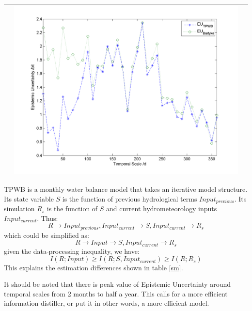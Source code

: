 \documentclass[11pt]{article}
\begin{document}
\begin{table}[H]
{\begin{tabular}{ccc}
&\begin{minipage}{.6\textwidth}\includegraphics[width=\linewidth]{resultgraph/11532500EU.png}\end{minipage}
\\
\bottomrule
\end{tabular}
}
\end{table} 

TPWB is a monthly water balance model that takes an iterative model structure. Its state variable $S$ is the function of previous hydrological terms $Input_{previous}$. Its simulation $R_s$ is the function of $S$ and current hydrometeorology inputs $Input_{current}$. Thus:
\begin{equation}
R \rightarrow Input_{previous},Input_{current} \rightarrow S,Input_{current} \rightarrow R_s
\end{equation}
which could be simplified  as:
 \begin{equation}
R \rightarrow Input \rightarrow S,Input_{current} \rightarrow R_s
\end{equation}
given the data-processing inequality, we have:
\begin{equation}
\label{ie2}
I(R;Input)\geq I(R;S,Input_{current}) \geq I(R;R_s)
\end{equation}
This explains the estimation differences shown in table \ref{sm}.

It should be noted that there is peak value of Epistemic Uncertainty  around temporal scales from 2 months to half a year. This calls for a more efficient information distiller, or put it in other words, a more efficient model.  
\end{document}
